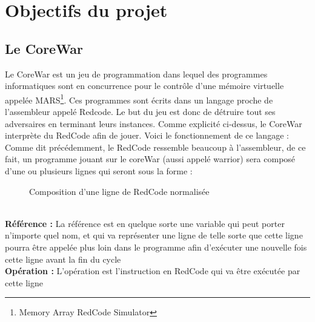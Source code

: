 \documentclass[a4paper,12pt]{article}
\begin{document}
\section{Objectifs du projet}
\subsection{Le CoreWar}
Le CoreWar est un jeu de programmation dans lequel des programmes informatiques sont en concurrence pour le contrôle d'une mémoire virtuelle appelée MARS\footnote{Memory Array RedCode Simulator}. Ces programmes sont écrits dans un langage proche de l'assembleur appelé Redcode. Le but du jeu est donc de détruire tout ses adversaires en terminant leurs instances.
\bigbreak
Comme explicité ci-dessus, le CoreWar interprète du RedCode afin de jouer. Voici le fonctionnement de ce langage :\\
Comme dit précédemment, le RedCode ressemble beaucoup à l'assembleur, de ce fait, un programme jouant sur le coreWar (aussi appelé warrior) sera composé d'une ou plusieurs lignes qui seront sous la forme :\\
\begin{figure}[htpb]
\caption{Composition d'une ligne de RedCode normalisée}
\end{figure}\\
\textbf{Référence : }La référence est en quelque sorte une variable qui peut porter n'importe quel nom, et qui va représenter une ligne de telle sorte que cette ligne pourra être appelée plus loin dans le programme afin d'exécuter une nouvelle fois cette ligne avant la fin du cycle\\
\textbf{Opération : }L'opération est l'instruction en RedCode qui va être exécutée par cette ligne\\
\end{document}
